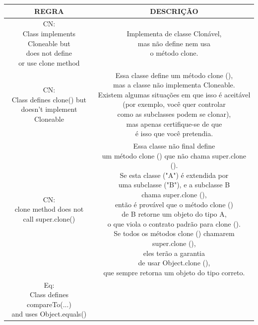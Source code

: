 \documentclass[12pt]{article}
\begin{document}
\begin{table}[h!]
 \begin{tabular}{| c | c |}
 \hline
 REGRA & DESCRIÇÃO \\ [0.5ex]
  \hline\hline
  \hline \makecell{CN:\\ Class implements\\ Cloneable but\\ does not define\\ or use clone method } &
  \makecell{Implementa de classe Clonável,\\ mas não define nem usa\\ o método clone.} \\
  \hline \makecell{CN:\\ Class defines clone() but \\ doesn't implement Cloneable } &
  \makecell{Essa classe define um método clone (),\\ mas a classe não implementa Cloneable.\\ Existem algumas situações em que isso é aceitável\\ (por exemplo, você quer controlar\\ como as subclasses podem se clonar),\\ mas apenas certifique-se de que\\ é isso que você pretendia.} \\
  \hline \makecell{CN:\\ clone method does not \\ call super.clone() } &
  \makecell{Essa classe não final define\\ um método clone () que não chama super.clone ().\\ Se esta classe ("A") é extendida por\\ uma subclasse ("B"), e a subclasse B\\ chama super.clone (),\\ então é provável que o método clone ()\\ de B retorne um objeto do tipo A,\\ o que viola o contrato padrão para clone ().\\ Se todos os métodos clone () chamarem super.clone (),\\ eles terão a garantia\\ de usar Object.clone (),\\ que sempre retorna um objeto do tipo correto.} \\
  \hline \makecell{Eq:\\ Class defines compareTo(...) \\ and uses Object.equals() } &

\end{tabular}
\end{table}
\end{document}
